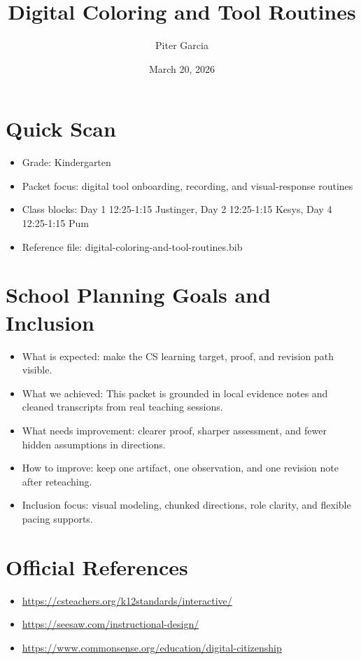 \documentclass[11pt]{article}
\title{Digital Coloring and Tool Routines}
\author{Piter Garcia}
\date{March 20, 2026}
\begin{document}
\maketitle
\section*{Quick Scan}
\begin{itemize}[leftmargin=*]
\item Grade: Kindergarten
\item Packet focus: digital tool onboarding, recording, and visual-response routines
\item Class blocks: Day 1 12:25-1:15 Justinger, Day 2 12:25-1:15 Kesys, Day 4 12:25-1:15 Pum
\item Reference file: digital-coloring-and-tool-routines.bib
\end{itemize}
\section*{School Planning Goals and Inclusion}
\begin{itemize}[leftmargin=*]
\item What is expected: make the CS learning target, proof, and revision path visible.
\item What we achieved: This packet is grounded in local evidence notes and cleaned transcripts from real teaching sessions.
\item What needs improvement: clearer proof, sharper assessment, and fewer hidden assumptions in directions.
\item How to improve: keep one artifact, one observation, and one revision note after reteaching.
\item Inclusion focus: visual modeling, chunked directions, role clarity, and flexible pacing supports.
\end{itemize}
\section*{Official References}
\begin{itemize}[leftmargin=*]
\item \url{https://csteachers.org/k12standards/interactive/}
\item \url{https://seesaw.com/instructional-design/}
\item \url{https://www.commonsense.org/education/digital-citizenship}
\end{itemize}
\end{document}
